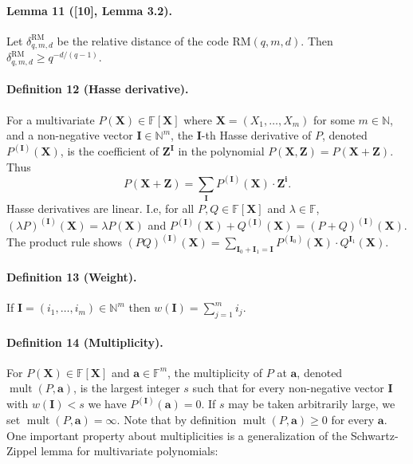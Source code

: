 \documentclass[10pt,a4paper]{article}
\begin{document}
\paragraph{Lemma 11 ([10], Lemma 3.2).} Let $\delta_{q,m,d}^{\mathrm{RM}}$ be the relative distance of the code $\mathrm{RM}(q,m,d)$. Then $\delta_{q,m,d}^{\mathrm{RM}}\geq q^{-d/(q-1)}$.
\paragraph{Definition 12 (Hasse derivative).} For a multivariate $P(\boldsymbol X)\in\mathbb F[\boldsymbol X]$ where $\boldsymbol X=(X_1,\ldots,X_m)$ for some $m\in\mathbb N$, and a non-negative vector $\boldsymbol I\in\mathbb N^m$, the $\boldsymbol I$-th Hasse derivative of $P$, denoted $P^{(\boldsymbol I)}(\boldsymbol X)$, is the coefficient of $\boldsymbol Z^{\boldsymbol I}$ in the polynomial $P(\boldsymbol X,\boldsymbol Z)=P(\boldsymbol X+\boldsymbol Z)$. Thus
\[P(\boldsymbol X+\boldsymbol Z)=\sum_{\boldsymbol I}P^{(\boldsymbol I)}(\boldsymbol X)\cdot\boldsymbol Z^{\boldsymbol i}.\]
Hasse derivatives are linear. I.e, for all $P,Q\in\mathbb F[\boldsymbol X]$ and $\lambda\in\mathbb F$, $(\lambda P)^{(\boldsymbol I)}(\boldsymbol X)=\lambda P(\boldsymbol X)$ and $P^{(\boldsymbol I)}(\boldsymbol X)+Q^{(\boldsymbol I)}(\boldsymbol X)=(P+Q)^{(\boldsymbol I)}(\boldsymbol X)$. The product rule shows $(PQ)^{(\boldsymbol I)}(\boldsymbol X)=\sum_{\boldsymbol I_0+\boldsymbol I_1=\boldsymbol I}P^{(\boldsymbol I_0)}(\boldsymbol X)\cdot Q^{\boldsymbol I_1}(\boldsymbol X)$.
\paragraph{Definition 13 (Weight).} If $\boldsymbol I=(i_1,\ldots,i_m)\in\mathbb N^m$ then $w(\boldsymbol I)=\sum_{j=1}^mi_j$.
\paragraph{Definition 14 (Multiplicity).} For $P(\boldsymbol X)\in\mathbb F[\boldsymbol X]$ and $\boldsymbol a\in\mathbb F^m$, the multiplicity of $P$ at $\boldsymbol a$, denoted $\operatorname{mult}(P,\boldsymbol a)$, is the largest integer $s$ such that for every non-negative vector $\boldsymbol I$ with $w(\boldsymbol I)<s$ we have $P^{(\boldsymbol I)}(\boldsymbol a)=0$. If $s$ may be taken arbitrarily large, we set $\operatorname{mult}(P,\boldsymbol a)=\infty$.
Note that by definition $\operatorname{mult}(P,\boldsymbol a)\geq0$ for every $\boldsymbol a$. One important property about multiplicities is a generalization of the Schwartz-Zippel lemma for multivariate polynomials:
\end{document}
